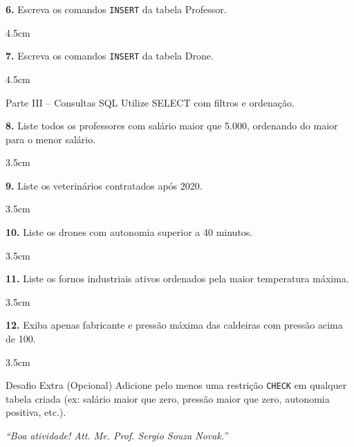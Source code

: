 \documentclass[12pt]{article}
\begin{document}
\textbf{6.} Escreva os comandos \texttt{INSERT} da tabela Professor.
\begin{resposta}{4.5cm}
\end{resposta}

\vspace{0.5cm}

\textbf{7.} Escreva os comandos \texttt{INSERT} da tabela Drone.
\begin{resposta}{4.5cm}
\end{resposta}

\vspace{0.8cm}

\begin{block}{Parte III – Consultas SQL}
Utilize SELECT com filtros e ordenação.
\end{block}

\textbf{8.} Liste todos os professores com salário maior que 5.000, ordenando do maior para o menor salário.
\begin{resposta}{3.5cm}
\end{resposta}

\vspace{0.5cm}

\textbf{9.} Liste os veterinários contratados após 2020.
\begin{resposta}{3.5cm}
\end{resposta}

\vspace{0.5cm}

\textbf{10.} Liste os drones com autonomia superior a 40 minutos.
\begin{resposta}{3.5cm}
\end{resposta}

\vspace{0.5cm}

\textbf{11.} Liste os fornos industriais ativos ordenados pela maior temperatura máxima.
\begin{resposta}{3.5cm}
\end{resposta}

\vspace{0.5cm}

\textbf{12.} Exiba apenas fabricante e pressão máxima das caldeiras com pressão acima de 100.
\begin{resposta}{3.5cm}
\end{resposta}

\vspace{0.8cm}

\begin{block}{Desafio Extra (Opcional)}
Adicione pelo menos uma restrição \texttt{CHECK} em qualquer tabela criada (ex: salário maior que zero, pressão maior que zero, autonomia positiva, etc.).
\end{block}

\vspace{0.5cm}

\begin{center}
\textit{“Boa atividade! Att. Me. Prof. Sergio Souza Novak.”}
\end{center}

\end{document}
